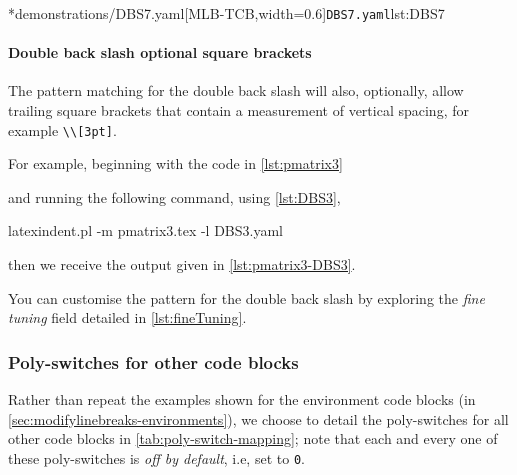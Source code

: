 		\begin{cmhtcbraster}[
				raster force size=false,
				raster column 1/.style={add to width=-.1\textwidth},
				raster column skip=.03\linewidth]
			\cmhlistingsfromfile[style=yaml-LST]*{demonstrations/DBS7.yaml}[MLB-TCB,width=0.6\textwidth]{\texttt{DBS7.yaml}}{lst:DBS7}
		\end{cmhtcbraster}

	\paragraph{Double back slash optional square brackets}
		The pattern matching for the double back slash will also, optionally, allow trailing
		square brackets that contain a measurement of vertical spacing, for example
		\lstinline!\\[3pt]!.

		For example, beginning with the code in \cref{lst:pmatrix3}


		and running the following command, using \cref{lst:DBS3},
		\begin{commandshell}
latexindent.pl -m pmatrix3.tex -l DBS3.yaml
\end{commandshell}
		then we receive the output given in \cref{lst:pmatrix3-DBS3}.


		You can customise the pattern for the double back slash by exploring the \emph{fine
			tuning} field detailed in \vref{lst:fineTuning}.

\subsubsection{Poly-switches for other code blocks}
	Rather than repeat the examples shown for the environment code blocks (in
	\vref{sec:modifylinebreaks-environments}), we choose to detail the poly-switches for all
	other code blocks in \cref{tab:poly-switch-mapping}; note that each and every one of
	these poly-switches is \emph{off by default}, i.e, set to \texttt{0}.

